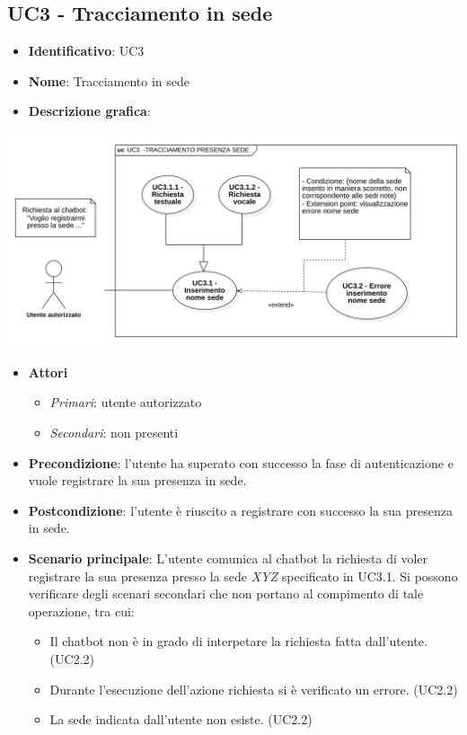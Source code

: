 \subsection{UC3 - Tracciamento  in sede}
\begin{itemize}
    \item \textbf{Identificativo}: UC3
    \item \textbf{Nome}: Tracciamento  in sede
    \item \textbf{Descrizione grafica}:
\end{itemize}
\begin{center}
    \includegraphics[scale=0.50]{images/UC2.png} 
\end{center}
\begin{itemize}
    \item \textbf{Attori}
 \begin{itemize} 
    \item \textit{Primari}: utente autorizzato
    \item \textit{Secondari}: non presenti
 \end{itemize}
 \item \textbf{Precondizione}: l'utente ha superato con successo la fase di autenticazione e vuole registrare la sua presenza in sede. 
 \item \textbf{Postcondizione}: l'utente è riuscito a registrare con successo la sua presenza in sede. 
 \item \textbf{Scenario principale}: L'utente comunica al chatbot la richiesta di voler registrare la sua presenza presso la sede \textit{XYZ} specificato in UC3.1. Si possono verificare degli scenari secondari che non portano al compimento di tale operazione, tra cui:
    \begin{itemize}
        \item Il chatbot non è in grado di interpetare la richiesta fatta dall'utente. (UC2.2)
        \item Durante l'esecuzione dell'azione richiesta si è verificato un errore. (UC2.2)
        \item La sede indicata dall'utente non esiste. (UC2.2)
    \end{itemize}
\end{itemize}
\newpage

